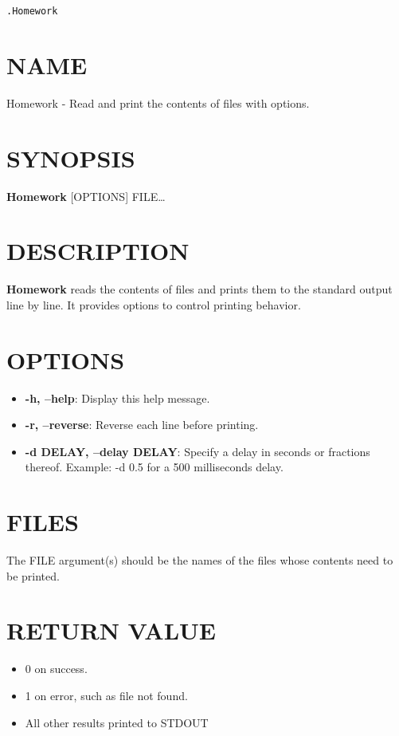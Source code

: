 \documentclass[11pt]{article}
\author{Christian}
\date{\today}
\title{}
\begin{document}
\texttt{.Homework}
\section{NAME}
\label{sec:orgad23a84}

Homework - Read and print the contents of files with options.
\section{SYNOPSIS}
\label{sec:orgdc771c4}

\textbf{Homework} [OPTIONS] FILE\ldots{}
\section{DESCRIPTION}
\label{sec:orgd4e71b4}

\textbf{Homework} reads the contents of files and prints them to the standard output line by line. It provides options to control printing behavior.
\section{OPTIONS}
\label{sec:orga94b931}

\begin{itemize}
\item \textbf{\textbf{-h, --help}}: Display this help message.
\item \textbf{\textbf{-r, --reverse}}: Reverse each line before printing.
\item \textbf{\textbf{-d DELAY, --delay DELAY}}: Specify a delay in seconds or fractions thereof. Example: -d 0.5 for a 500 milliseconds delay.
\end{itemize}
\section{FILES}
\label{sec:org0d68a65}

The FILE argument(s) should be the names of the files whose contents need to be printed.
\section{RETURN VALUE}
\label{sec:org938a2a9}

\begin{itemize}
\item 0 on success.
\item 1 on error, such as file not found.
\item All other results printed to STDOUT
\end{itemize}
\end{document}
